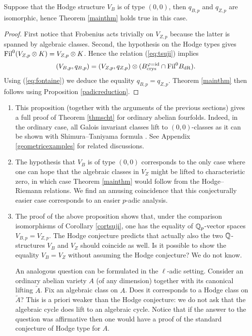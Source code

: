 \documentclass[11pt]{amsart}
\begin{document}
\begin{prop}\label{ordinarycase}
Suppose that the Hodge structure $V_B$ is of type $(0,0)$, then $q_{B,p}$ and $q_{Z,p}$ are isomorphic, hence Theorem \ref{mainthm}  holds true in this case.
\end{prop}
\begin{proof}
First notice that   Frobenius acts trivially on $V_{Z,p}$ because the latter is spanned by  algebraic classes. Second, the hypothesis on the Hodge types gives  
$\textnormal{Fil}^0(V_{Z,p} \otimes K)=V_{Z,p} \otimes K$. Hence the relation (\ref{eq:tsuji}) implies 
\[(V_{B,p},q_{B,p}) =(V_{Z,p},q_{Z,p})\otimes (B_{\textnormal{crys}}^{\varphi=\mathrm{id}} \cap \textnormal{Fil}^0B_{\mathrm{dR}}).\]
Using (\ref{eq:fontaine}) we deduce the equality $q_{B,p} = q_{Z,p}$. Theorem \ref{mainthm}  then follows using  Proposition \ref{padicreduction}.
\end{proof}
\begin{remark}\label{boris}\begin{enumerate}
\item This proposition (together with the arguments of the previous sections) gives a full proof of Theorem \ref{thmscht} for ordinary abelian fourfolds. Indeed, in the ordinary case, all Galois invariant classes lift to $(0,0)$-classes as it can be shown with Shimura--Taniyama  formula  \cite[Lemma 5]{TateBour}. See Appendix \ref{geometricexamples} for related discussions.
\item\label{duccio} The hypothesis that $V_B$ is of type $(0,0)$ corresponds to the only case where one can hope that the algebraic classes in $V_Z$ might be lifted to characteristic zero, in which case Theorem \ref{mainthm} would follow from the Hodge--Riemann relations. We find an amusing coincidence that this conjecturally easier  case corresponds to an easier $p$-adic analysis.
\item The proof of the above proposition shows that, under the comparison isomorphisms of Corollary \ref{cortsuji}, one has the equality of $\mathbb{Q}_p$-vector spaces $V_{B,p} = V_{Z,p}$. The Hodge conjecture  predicts   that actually also the two $\mathbb{Q}$-structures $V_B$ and $V_Z$ should coincide as well. Is it possible to show the equality $V_{B} = V_{Z}$ without assuming the Hodge conjecture? We do not know. 

An analogous question can be formulated in the $\ell$-adic setting. Consider an ordinary abelian variety $A$  (of any dimension) together with its canonical lifting $\tilde{A}$. Fix an algebraic class on $A$. Does it corresponds to a Hodge class on $\tilde{A}$? This is a priori weaker than the Hodge conjecture: we do not ask that the algebraic cycle does lift to an algebraic cycle. Notice that if the answer to the question was affirmative then one would have a proof of the standard conjecture of Hodge type for $A$.
\end{enumerate}
\end{remark}
\end{document}
